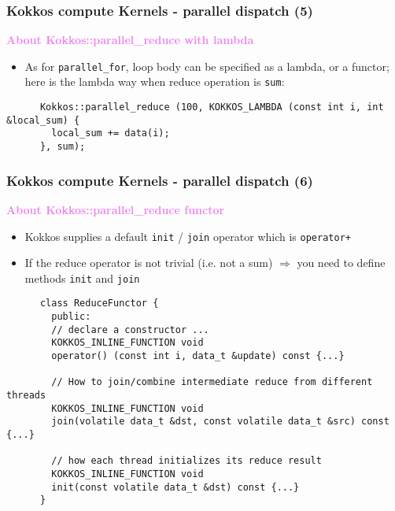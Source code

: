 \begin{frame}[fragile=singleslide]
  \frametitle{Kokkos compute Kernels - parallel dispatch (5)}

  {\large \textcolor{violet}{\textbf{About Kokkos::parallel\_reduce with lambda}}}

  \begin{itemize}
  \item As for \texttt{parallel\_for}, loop body can be specified as a lambda, or a functor; here is the lambda way when reduce operation is \texttt{sum}:
  \end{itemize}
  {\small
    \begin{verbatim}
      Kokkos::parallel_reduce (100, KOKKOS_LAMBDA (const int i, int &local_sum) {
        local_sum += data(i);
      }, sum);
    \end{verbatim}
  }
  
\end{frame}
  
\begin{frame}[fragile=singleslide]
  \frametitle{Kokkos compute Kernels - parallel dispatch (6)}

  {\large \textcolor{violet}{\textbf{About Kokkos::parallel\_reduce functor}}}

  \begin{itemize}
  \item Kokkos supplies a default \texttt{init} / \texttt{join} operator which is \texttt{operator+}
  \item If the reduce operator is not trivial (i.e. not a sum) $\Rightarrow$ you need to define methods \texttt{init} and \texttt{join}
  \end{itemize}

  {\small
    \begin{verbatim}
      class ReduceFunctor {
        public:
        // declare a constructor ...
        KOKKOS_INLINE_FUNCTION void 
        operator() (const int i, data_t &update) const {...}

        // How to join/combine intermediate reduce from different threads
        KOKKOS_INLINE_FUNCTION void 
        join(volatile data_t &dst, const volatile data_t &src) const {...}

        // how each thread initializes its reduce result
        KOKKOS_INLINE_FUNCTION void 
        init(const volatile data_t &dst) const {...}
      }
      \end{verbatim}
    }
\end{frame}

